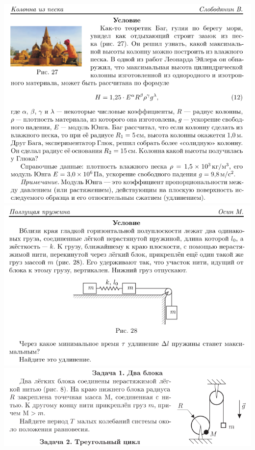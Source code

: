 \clearpage


\begin{center}
  \includegraphics[width=14cm]{reg20141}
  \includegraphics[width=14cm]{reg20142}
  \includegraphics[width=14cm]{reg20131}

\end{center}
